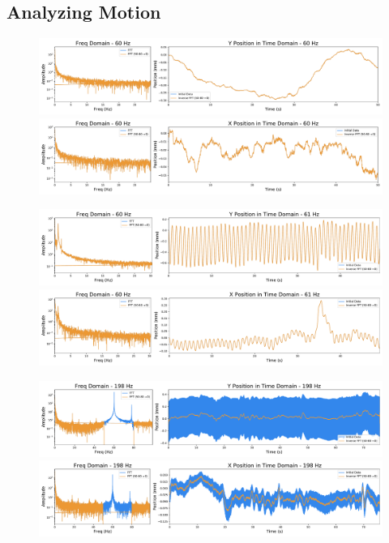 \documentclass[12pt]{article}
\begin{document}
\subsection{Analyzing Motion}
\begin{figure}[ht]
\centering
    \includegraphics[width=\textwidth]{data_01_y_pos.pdf}
	\caption{}
    \label{fig:01_y_pos}
    \includegraphics[width=\textwidth]{data_01_x_pos.pdf}
	\caption{}
    \label{fig:01_x_pos}
\end{figure}

\begin{figure}[ht]
\centering
    \includegraphics[width=\textwidth]{data_03_y_pos.pdf}
	\caption{}
    \label{fig:03_y_pos}
    \includegraphics[width=\textwidth]{data_03_x_pos.pdf}
	\caption{}
    \label{fig:03_x_pos}
\end{figure}

\begin{figure}[ht]
\centering
    \includegraphics[width=\textwidth]{data_04_y_pos.pdf}
	\caption{}
    \label{fig:04_y_pos}
    \includegraphics[width=\textwidth]{data_04_x_pos.pdf}
	\caption{}
    \label{fig:04_x_pos}
\end{figure}
\end{document}

